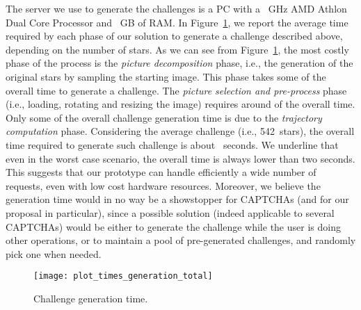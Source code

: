 \documentclass[conference]{IEEEtran}
\newcommand{\hilight}[1]{#1}
\begin{document}
The server we use to generate the challenges is a PC with a ~GHz AMD Athlon Dual Core Processor and ~GB of RAM.
In Figure~\ref{fig:timesGeneration},
\hilight{we report the average time required by each phase of our solution to generate a challenge described above, depending on the number of stars.
As we can see from Figure~\ref{fig:timesGeneration}, the most costly phase of the process is the \textit{picture decomposition} phase, i.e., the generation of the original stars by sampling the starting image.
This phase takes some  of the overall time to generate a challenge.
The \textit{picture selection and pre-process} phase (i.e., loading, rotating and resizing the image) requires around  of the overall time.
Only some  of the overall challenge generation time is due to the \textit{trajectory computation} phase.
Considering the average challenge (i.e., 542~stars), the overall time required to generate such challenge is about ~seconds.
We underline that even in the worst case scenario, the overall time is always lower than two seconds.}
This suggests that our prototype can handle efficiently a wide number of requests, even with low cost hardware resources.
\hilight{Moreover, we believe the generation time would in no way be a showstopper for CAPTCHAs (and for our proposal in particular), since a possible solution (indeed applicable to several CAPTCHAs) would be either to generate the challenge while the user is doing other operations, or to maintain a pool of pre-generated challenges, and randomly pick one when needed.}


\begin{figure}[ht]\centering
\texttt{[image: plot\_times\_generation\_total]}
\caption{Challenge generation time.}
\label{fig:timesGeneration}
\end{figure}
\end{document}
